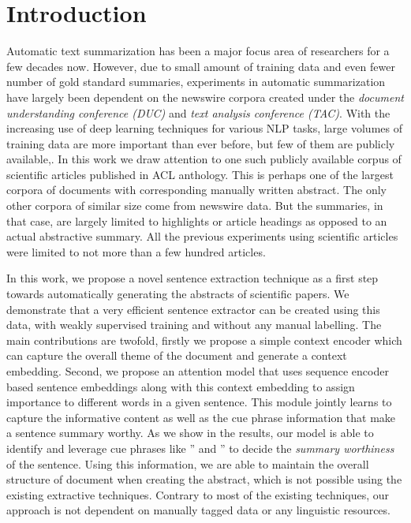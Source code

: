 \section{Introduction}

Automatic text summarization has been a major focus area of researchers for a few decades now. However, due to small amount of training data and even fewer number of gold standard summaries, experiments in automatic summarization have largely been dependent on the newswire corpora created under the \emph{document understanding conference (DUC)} and \emph{text analysis conference (TAC)}. With the increasing use of deep learning techniques for various NLP tasks, large volumes of training data are more important than ever before, but few of them are publicly available\cite{rush2015neural},\cite{filippova2015sentence}. In this work we draw attention to one such publicly available corpus of scientific articles published in ACL anthology. This is perhaps one of the largest corpora of documents with corresponding manually written abstract. The only other corpora of similar size come from newswire data. But the summaries, in that case, are largely limited to highlights or article headings as opposed to an actual abstractive summary. All the previous experiments using scientific articles were limited to not more than a few hundred articles\cite{abu2011coherent}. 

In this work, we propose a novel sentence extraction technique as a first step towards automatically generating the abstracts of scientific papers. We demonstrate that a very efficient sentence extractor can be created using this data, with weakly supervised training and without any manual labelling. The main contributions are twofold, firstly we propose a simple context encoder which can capture the overall theme of the document and generate a context embedding. Second, we propose an attention model that uses sequence encoder based sentence embeddings along with this context embedding to assign importance to different words in a given sentence. This module jointly learns to capture the informative content as well as the cue phrase information that make a sentence summary worthy. As we show in the results, our model is able to identify and leverage cue phrases like '' and '' to decide the \emph{summary worthiness} of the sentence. Using this information, we are able to maintain the overall structure of document when creating the abstract, which is not possible using the existing extractive techniques. Contrary to most of the existing techniques, our approach is not dependent on manually tagged data or any linguistic resources.
 
